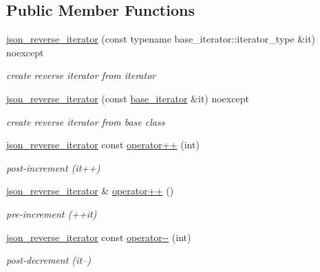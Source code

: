 \subsection*{Public Member Functions}
\begin{DoxyCompactItemize}
\item 
\hyperlink{classnlohmann_1_1detail_1_1json__reverse__iterator_a0246de16ece16293f2917dfa5d96e278}{json\+\_\+reverse\+\_\+iterator} (const typename base\+\_\+iterator\+::iterator\+\_\+type \&it) noexcept
\begin{DoxyCompactList}\small\item\em create reverse iterator from iterator \end{DoxyCompactList}\item 
\hyperlink{classnlohmann_1_1detail_1_1json__reverse__iterator_a6c2d025530114ed989188e8adfc8467e}{json\+\_\+reverse\+\_\+iterator} (const \hyperlink{classnlohmann_1_1detail_1_1json__reverse__iterator_a6b2ef1d632fe49bfcc22fbd1abd62395}{base\+\_\+iterator} \&it) noexcept
\begin{DoxyCompactList}\small\item\em create reverse iterator from base class \end{DoxyCompactList}\item 
\hyperlink{classnlohmann_1_1detail_1_1json__reverse__iterator}{json\+\_\+reverse\+\_\+iterator} const \hyperlink{classnlohmann_1_1detail_1_1json__reverse__iterator_aada9d2b320002ef870c5283cda2c1e9d}{operator++} (int)
\begin{DoxyCompactList}\small\item\em post-\/increment (it++) \end{DoxyCompactList}\item 
\hyperlink{classnlohmann_1_1detail_1_1json__reverse__iterator}{json\+\_\+reverse\+\_\+iterator} \& \hyperlink{classnlohmann_1_1detail_1_1json__reverse__iterator_a26caf0069a50ce4ecb010a1453e883fc}{operator++} ()
\begin{DoxyCompactList}\small\item\em pre-\/increment (++it) \end{DoxyCompactList}\item 
\hyperlink{classnlohmann_1_1detail_1_1json__reverse__iterator}{json\+\_\+reverse\+\_\+iterator} const \hyperlink{classnlohmann_1_1detail_1_1json__reverse__iterator_a2c170f51371538da2c8f4094305da3d3}{operator-\/-\/} (int)
\begin{DoxyCompactList}\small\item\em post-\/decrement (it--) \end{DoxyCompactList}\item 

\end{DoxyCompactItemize}
